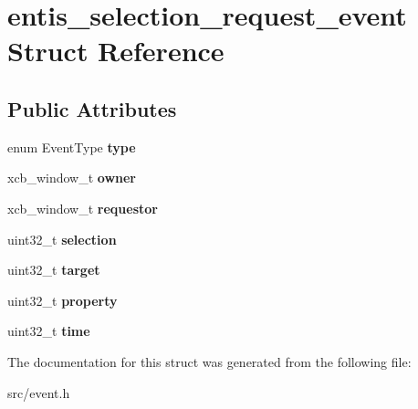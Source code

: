 \hypertarget{structentis__selection__request__event}{}\section{entis\+\_\+selection\+\_\+request\+\_\+event Struct Reference}
\label{structentis__selection__request__event}
\subsection*{Public Attributes}
\begin{DoxyCompactItemize}
\item 
\mbox{\label{structentis__selection__request__event_aee8904ac76db29ce9b0123bbd4d85b5c}} 
enum Event\+Type {\bfseries type}
\item 
\mbox{\label{structentis__selection__request__event_aaceb6c7f240b566ed54421ed896cd0a4}} 
xcb\+\_\+window\+\_\+t {\bfseries owner}
\item 
\mbox{\label{structentis__selection__request__event_adc20713966136351b076a299bf7fb5b6}} 
xcb\+\_\+window\+\_\+t {\bfseries requestor}
\item 
\mbox{\label{structentis__selection__request__event_a8cb4601af191b6011c3204f3a3fcfce4}} 
uint32\+\_\+t {\bfseries selection}
\item 
\mbox{\label{structentis__selection__request__event_aae35872040ffbe27cc15d1240fc74c6d}} 
uint32\+\_\+t {\bfseries target}
\item 
\mbox{\label{structentis__selection__request__event_a8b1f33091c9d307fa4a43847f4670dfd}} 
uint32\+\_\+t {\bfseries property}
\item 
\mbox{\label{structentis__selection__request__event_a4b4e856790b3f8f990a8da971ae33a1d}} 
uint32\+\_\+t {\bfseries time}
\end{DoxyCompactItemize}


The documentation for this struct was generated from the following file\+:\begin{DoxyCompactItemize}
\item 
src/event.\+h\end{DoxyCompactItemize}
